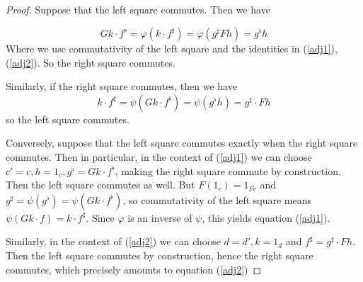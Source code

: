 \documentclass[../../solutions]{subfiles}
\begin{document}
\begin{proof}
Suppose that the left square commutes. Then we have

\[
Gk \cdot f^\flat = \varphi(k \cdot f^\sharp) = \varphi(g^\sharp Fh) = g^\flat h 
\]
Where we use commutativity of the left square and the identities in (\ref{adj1}), (\ref{adj2}). So the right square commutes. 

Similarly, if the right square commutes, then we have
\[
k \cdot f^\sharp = \psi(Gk \cdot f^\flat) = \psi (g^\flat h) = g^\sharp \cdot Fh
\]
so the left square commutes.

Conversely, suppose that the left square commutes exactly when the right square commutes. Then in particular, in the context of (\ref{adj1}) we can choose $c' = c, h = 1_{c}, g^\flat =Gk \cdot f^\flat$, making the right square commute by construction. Then the left square commutes as well. But $F(1_c)=1_{Fc}$ and $g^\sharp = \psi(g^\flat)=\psi(Gk\cdot f^\flat)$, so commutativity of the left square means $\psi(Gk\cdot f) = k\cdot f^\sharp$. Since $\varphi$ is an inverse of $\psi$, this yields equation (\ref{adj1}). 

Similarly, in the context of (\ref{adj2}) we can choose $d = d', k = 1_d$ and $f^\sharp = g^\sharp \cdot Fh$. Then the left square commutes by construction, hence the right square commutes, which precisely amounts to equation (\ref{adj2})
\end{proof}
\end{document}
